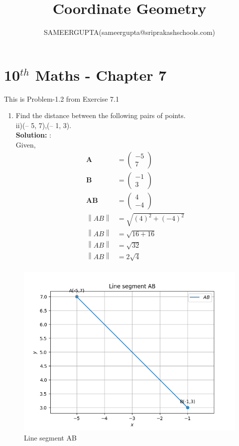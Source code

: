 \documentclass[12pt]{article}
\title{Coordinate Geometry}
\author{SAMEERGUPTA(sameergupta@sriprakashschools.com)}
\newcommand{\myvec}[1]{\ensuremath{\begin{pmatrix}#1\end{pmatrix}}}
\newcommand{\solution}{\noindent \textbf{Solution: }}
\providecommand{\norm}[1]{\left\lVert#1\right\rVert}
\let\vec\mathbf
\begin{document}
\maketitle
\section*{10$^{th}$ Maths - Chapter 7}
This is Problem-1.2 from Exercise 7.1
\begin{enumerate}
\item Find the distance between the following pairs of points.\\
 ii)(– 5, 7),(– 1, 3).\\
\solution:\\
Given,
\begin{align}
\vec{A}&=\myvec{-5\\7}\\
\vec{B}&=\myvec{-1\\3}\\
\vec{AB}&=\myvec{4\\-4}\\
\norm{AB}&=\sqrt{(4)^2+(-4)^2}\\
\norm{AB}&=\sqrt{16+16}\\
\norm{AB}&=\sqrt{32}\\
\norm{AB}&=2\sqrt{4}\\
\end{align}
\end{enumerate}
\begin{figure}[H]
			\centering
			\includegraphics[width=\columnwidth]{figs/Figure_1.png}
			\caption{Line segment AB}
			\label{fig:13}
		\end{figure}
\end{document}
